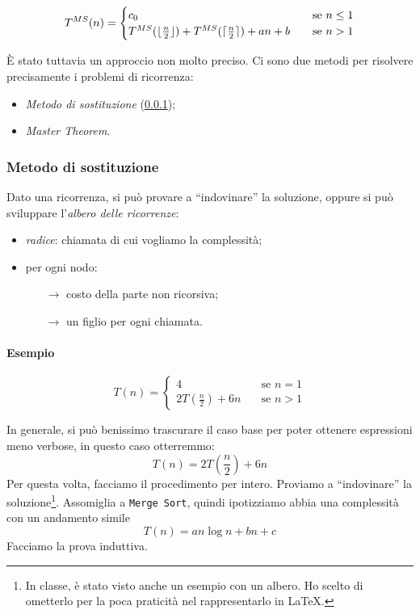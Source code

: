 \[ T^{MS}(n) =
\begin{cases}
c_0       & \quad \text{se } n \leq 1 \\
T^{MS}(\lfloor\frac{n}{2}\rfloor)+T^{MS}(\lceil\frac{n}{2}\rceil) + an + b  & \quad \text{se } n>1
\end{cases}
\]

È stato tuttavia un approccio non molto preciso. Ci sono due metodi per risolvere precisamente 
i problemi di ricorrenza:
\begin{itemize}[noitemsep]
	\item \emph{Metodo di sostituzione} (\ref{ricorrenze:sostituzione});
	\item \emph{Master Theorem}.
\end{itemize}

\subsubsection{Metodo di sostituzione} \label{ricorrenze:sostituzione}
Dato una ricorrenza, si può provare a ``indovinare'' la soluzione, oppure si può sviluppare l'\emph{albero %
delle ricorrenze}:
\begin{itemize}
	\item \emph{radice}: chiamata di cui vogliamo la complessità;
	\item per ogni nodo:
	\begin{itemize}
		\item[$\rightarrow$] costo della parte non ricorsiva;
		\item[$\rightarrow$] un figlio per ogni chiamata.
	\end{itemize}
\end{itemize}

\paragraph{Esempio} 

\[ T(n) =
\begin{cases}
4       & \quad \text{se } n = 1 \\
2T(\frac{n}{2})+ 6n  & \quad \text{se } n>1
\end{cases}
\]

In generale, si può benissimo trascurare il caso base per poter ottenere espressioni meno verbose, in questo 
caso otterremmo:
\begin{displaymath}
	T(n) = 2T(\frac{n}{2})+ 6n
\end{displaymath}
Per questa volta, facciamo il procedimento per intero.
Proviamo a ``indovinare'' la soluzione\footnote{In classe, è stato visto anche un esempio con un albero. Ho scelto di ometterlo per la poca praticità nel rappresentarlo in \LaTeX.}. Assomiglia a \texttt{Merge Sort},
quindi ipotizziamo abbia una complessità con un andamento simile 
\begin{displaymath}
	T(n) = an \log n + bn + c
\end{displaymath}
Facciamo la prova induttiva.

